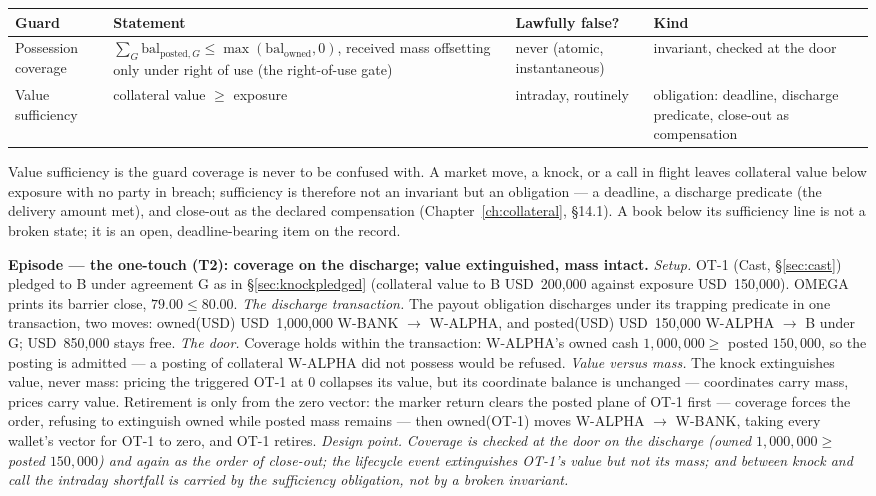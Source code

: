 \documentclass[11pt,a4paper]{article}
\newcommand{\USD}[1]{\mbox{USD~#1}}
\begin{document}
\begin{center}
\begin{tabular}{@{}p{}p{}p{}p{}@{}}
\toprule
Guard & Statement & Lawfully false? & Kind \\
\midrule
Possession coverage & $\sum_G \mathrm{bal}_{\mathrm{posted},G} \le \max(\mathrm{bal}_{\mathrm{owned}},0)$, received mass offsetting only under right of use (the right-of-use gate) & never (atomic, instantaneous) & invariant, checked at the door \\
Value sufficiency & collateral value $\ge$ exposure & intraday, routinely & obligation: deadline, discharge predicate, close-out as compensation \\
\bottomrule
\end{tabular}
\end{center}

\noindent Value sufficiency is the guard coverage is never to be confused with. A
market move, a knock, or a call in flight leaves collateral value below exposure
with no party in breach; sufficiency is therefore not an invariant but an
obligation --- a deadline, a discharge predicate (the delivery amount met), and
close-out as the declared compensation (Chapter~\ref{ch:collateral}, \S 14.1). A
book below its sufficiency line is not a broken state; it is an open,
deadline-bearing item on the record.

\medskip\noindent\textbf{Episode --- the one-touch (T2): coverage on the
discharge; value extinguished, mass intact.}
\emph{Setup.} OT-1 (Cast, \S\ref{sec:cast}) pledged to B under agreement G as in
\S\ref{sec:knockpledged} (collateral value to B \USD{200{,}000} against exposure
\USD{150{,}000}). OMEGA prints its barrier close, $79.00 \le 80.00$.
\emph{The discharge transaction.} The payout obligation discharges under its
trapping predicate in one transaction, two moves: owned(USD) \USD{1{,}000{,}000}
W-BANK $\to$ W-ALPHA, and posted(USD) \USD{150{,}000} W-ALPHA $\to$ B under G;
\USD{850{,}000} stays free.
\emph{The door.} Coverage holds within the transaction: W-ALPHA's owned cash
$1{,}000{,}000 \ge$ posted $150{,}000$, so the posting is admitted --- a posting
of collateral W-ALPHA did not possess would be refused.
\emph{Value versus mass.} The knock extinguishes value, never mass: pricing the
triggered OT-1 at $0$ collapses its value, but its coordinate balance is unchanged
--- coordinates carry mass, prices carry value. Retirement is only from the zero
vector: the marker return clears the posted plane of OT-1 first --- coverage
forces the order, refusing to extinguish owned while posted mass remains --- then
owned(OT-1) moves W-ALPHA $\to$ W-BANK, taking every wallet's vector for OT-1 to
zero, and OT-1 retires.
\emph{Design point.} \emph{Coverage is checked at the door on the discharge
(owned $1{,}000{,}000 \ge$ posted $150{,}000$) and again as the order of close-out;
the lifecycle event extinguishes OT-1's value but not its mass; and between knock
and call the intraday shortfall is carried by the sufficiency obligation, not by a
broken invariant.}
\end{document}
